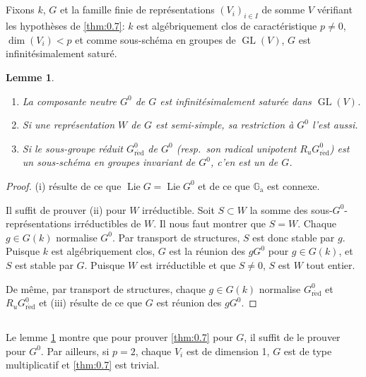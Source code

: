\documentclass[11pt,a4paper]{article}
\theoremstyle{plain}
\newtheorem{lemma}[theorem]{Lemme}
\theoremstyle{definition}
\DeclareMathOperator{\Lie}{Lie}
\DeclareMathOperator{\GL}{GL}
\newcommand{\Ga}{\mathbb{G}_\mathrm{a}}
\newcommand{\red}{\mathrm{r\acute{e}d}}
\begin{document}
\subsection{}
Fixons $k$, $G$ et la famille finie de repr\'esentations $(V_i)_{i \in I}$ de somme $V$ v\'erifiant les hypoth\`eses de \ref{thm:0.7}: $k$ est alg\'ebriquement clos de caract\'eristique $p \neq 0$, $\dim(V_i) < p$ et comme sous-sch\'ema en groupes de $\GL(V)$, $G$ est infinit\'esimalement satur\'e.

\begin{lemma}\label{lem:1.3}
\begin{enumerate}[label=(\roman*)]
\item La composante neutre $G^0$ de $G$ est infinit\'esimalement satur\'ee dans $\GL(V)$.
\item Si une repr\'esentation $W$ de $G$ est semi-simple, sa restriction \`a $G^0$ l'est aussi.
\item Si le sous-groupe r\'eduit $G^0_\red$ de $G^0$ (resp.\ son radical unipotent $R_u G^0_\red$) est un sous-sch\'ema en groupes invariant de $G^0$, c'en est un de $G$.
\end{enumerate}
\end{lemma}

\begin{proof}
(i) r\'esulte de ce que $\Lie G = \Lie G^0$ et de ce que $\Ga$ est connexe.

Il suffit de prouver (ii) pour $W$ irr\'eductible. Soit $S \subset W$ la somme des sous-$G^0$-repr\'e\-sen\-ta\-tions irr\'eductibles de $W$. Il nous faut montrer que $S = W$. Chaque $g \in G(k)$ normalise $G^0$. Par transport de structures, $S$ est donc stable par $g$. Puisque $k$ est alg\'ebriquement clos, $G$ est la r\'eunion des $gG^0$ pour $g \in G(k)$, et $S$ est stable par $G$. Puisque $W$ est irr\'eductible et que $S \neq 0$, $S$ est $W$ tout entier.

De m\^eme, par transport de structures, chaque $g \in G(k)$ normalise $G^0_\red$ et $R_u G^0_\red$ et (iii) r\'esulte de ce que $G$ est r\'eunion des $gG^0$.
\end{proof}

\subsection{}
Le lemme \ref{lem:1.3} montre que pour prouver \ref{thm:0.7} pour $G$, il suffit de le prouver pour $G^0$. Par ailleurs, si $p = 2$, chaque $V_i$ est de dimension 1, $G$ est de type multiplicatif et \ref{thm:0.7} est trivial.
\end{document}
